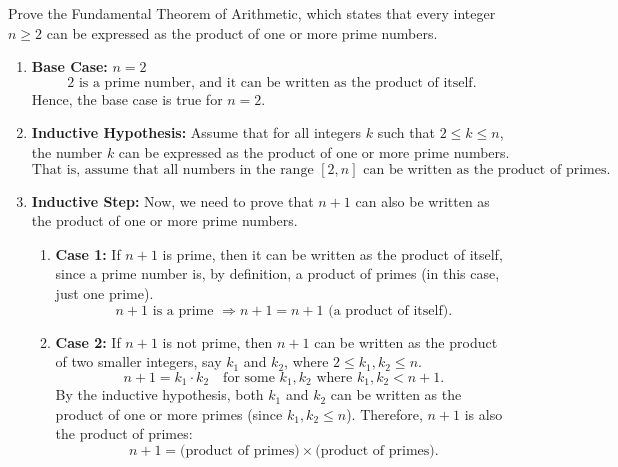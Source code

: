 \begin{example}
    Prove the Fundamental Theorem of Arithmetic, which states that every integer \( n \geq 2 \) can be expressed as the product of one or more prime numbers.

    \begin{enumerate}

        \item \textbf{Base Case:} \( n = 2 \)
        \[
        2 \text{ is a prime number, and it can be written as the product of itself.}
        \]
        Hence, the base case is true for \( n = 2 \).

        \item \textbf{Inductive Hypothesis:} Assume that for all integers \( k \) such that \( 2 \leq k \leq n \), the number \( k \) can be expressed as the product of one or more prime numbers.
        \[
        \text{That is, assume that all numbers in the range } [2, n] \text{ can be written as the product of primes.}
        \]

        \item \textbf{Inductive Step:} Now, we need to prove that \( n + 1 \) can also be written as the product of one or more prime numbers.
        
        \begin{enumerate}
            \item \textbf{Case 1:} If \( n + 1 \) is prime, then it can be written as the product of itself, since a prime number is, by definition, a product of primes (in this case, just one prime).
            \[
            n + 1 \text{ is a prime } \Rightarrow n + 1 = n + 1 \text{ (a product of itself)}.
            \]
            
            \item \textbf{Case 2:} If \( n + 1 \) is not prime, then \( n + 1 \) can be written as the product of two smaller integers, say \( k_1 \) and \( k_2 \), where \( 2 \leq k_1, k_2 \leq n \).
            \[
            n + 1 = k_1 \cdot k_2 \quad \text{for some } k_1, k_2 \text{ where } k_1, k_2 < n+1.
            \]
            By the inductive hypothesis, both \( k_1 \) and \( k_2 \) can be written as the product of one or more primes (since \( k_1, k_2 \leq n \)).
            Therefore, \( n + 1 \) is also the product of primes:
            \[
            n + 1 = \text{(product of primes)} \times \text{(product of primes)}.
            \]
        \end{enumerate}
    \end{enumerate}

\end{example}

